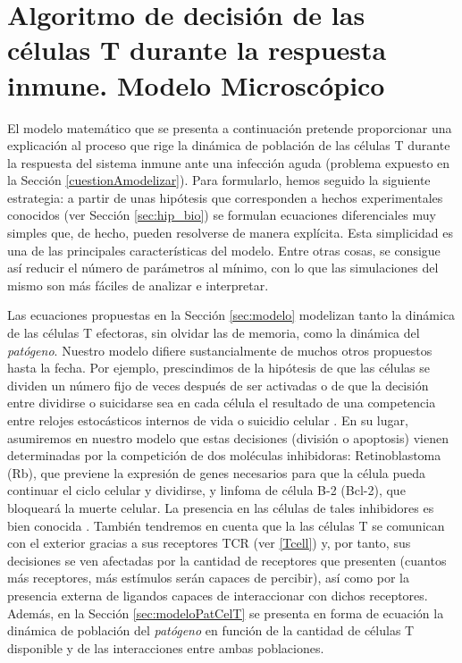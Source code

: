 \chapter{Algoritmo de decisión de las células T durante la respuesta inmune. Modelo Microscópico}
\label{cap:descripcionTrabajo}


El modelo matemático que se presenta a continuación pretende proporcionar una explicación al proceso que rige la dinámica de población de las células T durante la respuesta del sistema inmune ante una infección aguda (problema expuesto en la Sección \ref{cuestionAmodelizar}). Para formularlo, hemos seguido la siguiente estrategia: a partir de unas hipótesis que corresponden a hechos experimentales conocidos (ver Sección \ref{sec:hip_bio}) se formulan ecuaciones diferenciales muy simples que, de hecho, pueden resolverse de manera explícita. Esta simplicidad es una de las principales características del modelo. Entre otras cosas, se consigue así reducir el número de parámetros al mínimo, con lo que las simulaciones del mismo son más fáciles de analizar e interpretar. 

Las ecuaciones propuestas en la Sección \ref{sec:modelo} modelizan tanto la dinámica de las células T efectoras, sin olvidar las de memoria, como la dinámica del \textit{patógeno}. Nuestro modelo  difiere sustancialmente  de  muchos otros propuestos hasta la fecha. Por ejemplo, prescindimos de la hipótesis de que las células se dividen un número fijo de veces después de ser activadas \citep{JTB} o  de que la decisión entre dividirse o suicidarse sea en cada célula el resultado de una competencia entre relojes estocásticos internos de vida o suicidio celular \citep{JTB}. En su lugar, asumiremos en nuestro modelo que estas decisiones (división o apoptosis) vienen determinadas por la competición de dos moléculas inhibidoras: Retinoblastoma (Rb), que previene la expresión de genes necesarios para que la célula pueda continuar el ciclo celular y dividirse, y linfoma de célula B-2 (Bcl-2), que bloqueará la muerte celular. La presencia en las células de tales inhibidores es bien conocida \citep{fernandez2012mecanica}. También tendremos en cuenta que la las células T se comunican con el exterior gracias a sus receptores TCR (ver \ref{Tcell}) y, por tanto, sus decisiones se ven afectadas por la cantidad de receptores que presenten (cuantos más receptores, más estímulos serán capaces de percibir), así como por la presencia externa de ligandos capaces de interaccionar con dichos receptores. Además, en la Sección \ref{sec:modeloPatCelT} se presenta en forma de ecuación la dinámica de población del \textit{patógeno} en función de la cantidad de células T disponible y de las interacciones entre ambas poblaciones.

